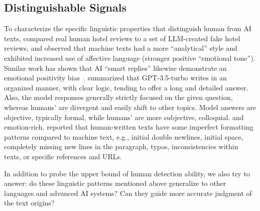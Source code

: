 \subsection{Distinguishable Signals} %
To characterize the specific linguistic properties that distinguish human from AI texts, \citet{markowitz2024linguistic} compared real human hotel reviews to a set of LLM-created fake hotel reviews, and observed that machine texts had a more ``analytical'' style and exhibited increased use of affective language (stronger positive ``emotional tone''). Similar work has shown that AI ``smart replies'' likewise demonstrate an emotional positivity bias~\cite{mieczkowski2021ai}. 
\citet{guo-etal-2023-hc3} summarized that GPT-3.5-turbo writes in an organized manner, with clear logic, tending to offer a long and detailed answer. Also, the model responses generally strictly focused on the given question, whereas humans’ are divergent and easily shift to other topics. Model answers are objective, typically formal, while humans’ are more subjective, colloquial. and emotion-rich.
\citet{wang2024m4gtbench} reported that human-written texts have some imperfect formatting patterns compared to machine text, e.g., initial double newlines, initial space, completely missing new lines in the paragraph, typos, inconsistencies within texts, or specific references and URLs.

In addition to probe the upper bound of human detection ability, we also try to answer: do these linguistic patterns mentioned above generalize to other languages and advanced AI systems? Can they guide more accurate judgment of the text origins?

